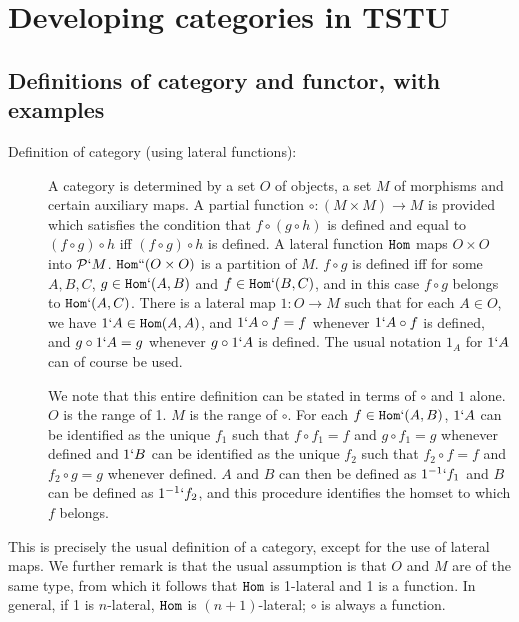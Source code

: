 \documentclass[12pt]{article}
\begin{document}
\section{Developing categories in TSTU}

\subsection{Definitions of category and functor, with examples}

\begin{description}

\item[Definition of category (using lateral functions):]  A category is determined by a set $O$ of objects, a set $M$ of morphisms and certain auxiliary maps.  A partial function $\circ:(M \times M) \rightarrow M$ is provided
which satisfies the condition that $f \circ (g \circ h)$ is defined and equal to $(f \circ g) \circ h$ iff $(f \circ g) \circ h$ is defined.
A lateral function ${\tt Hom}$ maps $O \times O$ into ${\cal P}`M$.  ${\tt Hom}``(O\times O)$ is a partition of $M$.  $f \circ g$ is defined iff
for some $A,B,C$, $g \in {\tt Hom}`(A,B)$ and $f \in {\tt Hom}`(B,C)$, and in this case $f \circ g$ belongs to ${\tt Hom}`(A,C)$.  There is a lateral map $1:O \rightarrow M$ such
that for each $A \in O$, we have $1`A \in {\tt Hom}(A,A)$, and $1`A \circ f = f$ whenever $1`A \circ f$ is defined, and $g \circ 1`A = g$ whenever $g \circ 1`A$ is defined.
The usual notation $1_A$ for $1`A$ can of course be used.

We note that this entire definition can be stated in terms of $\circ$ and $1$ alone.  $O$ is the range of 1.  $M$ is the range of $\circ$.  For each $f \in {\tt Hom}`(A,B)$,
$1`A$ can be identified as the unique $f_1$ such that $f \circ f_1 = f$ and $g \circ f_1 = g$ whenever defined and $1`B$ can be identified as the unique $f_2$ such that
$f_2 \circ f = f$ and $f_2 \circ g = g$ whenever defined.  $A$ and $B$ can then be defined as $1^{-1}`f_1$ and $B$ can be defined as $1^{-1}`f_2$, and this procedure identifies the homset to which $f$ belongs.

\end{description}

This is precisely the usual definition of a category, except for the use of lateral maps.  We further remark is that the usual assumption is that $O$ and $M$ are of the same type,
from which it follows that ${\tt Hom}$ is 1-lateral and 1 is a function.  In general, if 1 is $n$-lateral, ${\tt Hom}$ is $(n+1)$-lateral; $\circ$ is always a function.
\end{document}
